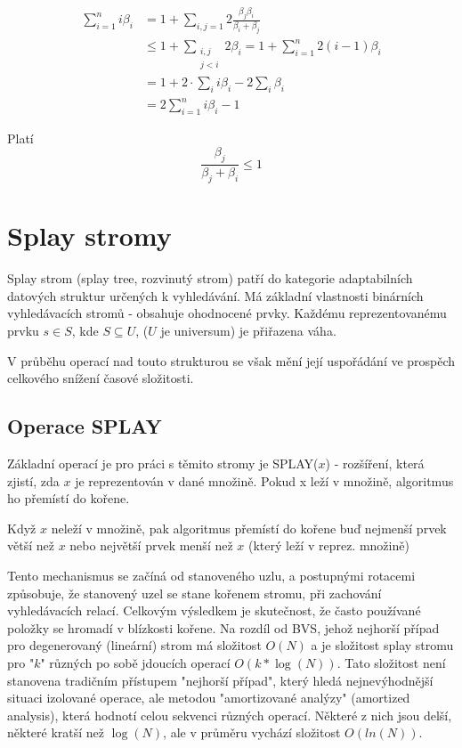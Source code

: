 \begin{equation}
\begin{split}
\sum_{i=1}^{n}i\beta_i 
& = 1 + \sum_{i,j=1} 2\frac{\beta_j\beta_i}{\beta_i+\beta_j} \\
& \leq 1 + \sum_{\substack{i,j\\j<i}} 2\beta_i 
= 1 + \sum_{i=1}^{n} 2(i-1)\beta_i \\
& = 1 + 2\cdot\sum_{i}i\beta_i - 2\sum_{i}\beta_i \\
& = 2\sum_{i=1}^{n}i\beta_i - 1
\end{split}
\end{equation}

Platí
$$
\frac{\beta_j}{\beta_j+\beta_i} \leq 1
$$



\section{Splay stromy}


Splay strom (splay tree, rozvinutý strom) patří do kategorie 
adaptabilních datových struktur určených k vyhledávání. Má základní 
vlastnosti binárních vyhledávacích stromů - obsahuje ohodnocené prvky. 
Každému reprezentovanému prvku $s \in S$, kde $S \subseteq U$, 
($U$ je universum) je přiřazena váha.
\par
V průběhu operací nad touto strukturou se však mění její uspořádání 
ve prospěch celkového snížení časové složitosti.


\subsection{Operace SPLAY}

Základní operací je pro práci s těmito stromy je SPLAY($x$) - rozšíření, 
která zjistí, zda $x$ je reprezentován v dané množině. 
Pokud x leží v množině, algoritmus ho přemístí do kořene.

Když $x$ neleží v množině, pak algoritmus přemístí do kořene buď nejmenší
prvek větší než $x$ nebo největší prvek menší než $x$ (který leží v reprez.
množině)

Tento mechanismus 
se začíná od stanoveného uzlu, a postupnými rotacemi způsobuje, že 
stanovený uzel se stane kořenem stromu, při zachování vyhledávacích 
relací. Celkovým výsledkem je skutečnost, že často používané položky se 
hromadí v blízkosti kořene. Na rozdíl od BVS, jehož nejhorší případ pro 
degenerovaný (lineární) strom má složitost $O(N)$ a je složitost splay 
stromu pro "$k$" různých po sobě jdoucích operací $O(k*\log(N))$. Tato 
složitost není stanovena tradičním přístupem "nejhorší případ", který hledá 
nejnevýhodnější situaci izolované operace, ale metodou "amortizované 
analýzy" (amortized analysis), která hodnotí celou sekvenci různých 
operací. Některé z nich jsou delší, některé kratší než $\log(N)$, ale v 
průměru vychází složitost $O(ln(N))$.

